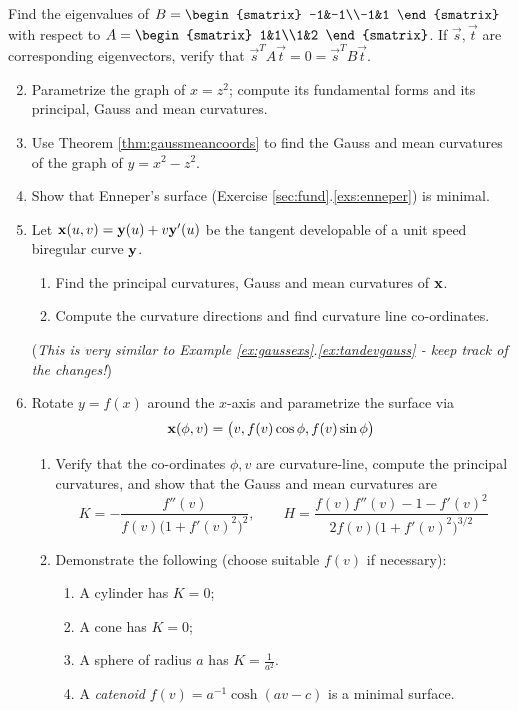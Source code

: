 \begin{exercises}{}{}
\exstart Find the eigenvalues of $B=\begin{smatrix}
-1&-1\\-1&1
\end{smatrix}$ with respect to $A=\begin{smatrix}
1&1\\1&2
\end{smatrix}$. If $\vec s,\vec t$ are corresponding eigenvectors, verify that $\vec s^TA\vec t=0=\vec s^TB\vec t$.

\begin{enumerate}\setcounter{enumi}{1}
  \item Parametrize the graph of $x=z^2$; compute its fundamental forms and its principal, Gauss and mean curvatures.
  
  
  \item Use Theorem \ref{thm:gaussmeancoords} to find the Gauss and mean curvatures of the graph of $y=x^2-z^2$.
  
  
  \item Show that Enneper's surface (Exercise \ref*{sec:fund}.\ref{exs:enneper}) is minimal.
    
    
  \item\label{exs:tandevcurv} Let ${\mathbf{x}}(u,v)={\mathbf{y}}(u)+v{\mathbf{y}}'(u)$ be the tangent developable of a unit speed biregular curve ${\mathbf{y}}$.
  \begin{enumerate}
    \item Find the principal curvatures, Gauss and mean curvatures of ${\mathbf{x}}$.
		\item Compute the curvature directions and find curvature line co-ordinates.
	\end{enumerate}
	(\emph{This is very similar to Example \ref*{ex:gaussexs}.\ref{ex:tandevgauss} - keep track of the changes!})

	\item Rotate $y=f(x)$ around the $x$-axis and parametrize the surface via
	\[{\mathbf{x}}(\phi,v)=\bigl(v,f(v)\cos\phi,f(v)\sin\phi\bigr)\]
	\begin{enumerate}
	  \item Verify that the co-ordinates $\phi,v$ are curvature-line, compute the principal curvatures, and show that the Gauss and mean curvatures are
		\[K=-\frac{f''(v)}{f(v)\bigl(1+f'(v)^2\bigr)^2},\qquad H=\frac{f(v)f''(v)-1-f'(v)^2}{2f(v)\bigl(1+f'(v)^2\bigr)^{3/2}}\]
		\item Demonstrate the following (choose suitable $f(v)$ if necessary):
		\begin{enumerate}
		  \item A cylinder has $K=0$;
		  \item A cone has $K=0$;
		  \item A sphere of radius $a$ has $K=\frac 1{a^2}$.
		  \item A \emph{catenoid} $f(v)=a^{-1}\cosh(av-c)$ is a minimal surface.
		\end{enumerate}
	\end{enumerate}


\end{enumerate}
\end{exercises}
